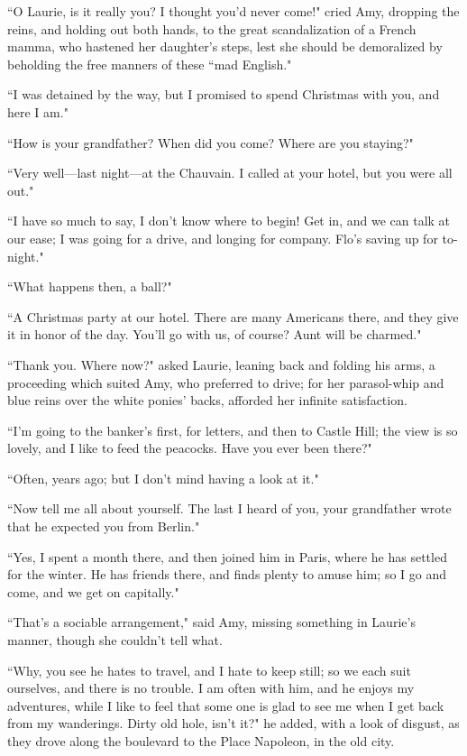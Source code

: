 ``O Laurie, is it really you? I thought you'd never
come!" cried Amy, dropping the reins, and holding out both hands, to the
great scandalization of a French mamma, who hastened her
daughter's steps, lest she should be demoralized by
beholding the free manners of these ``mad English."

``I was detained by the way, but I promised to spend Christmas with you,
and here I am."

``How is your grandfather? When did you come? Where are you staying?"

``Very well---last night---at the Chauvain. I called at your hotel, but
you were all out."

``I have so much to say, I don't know where to begin! Get
in, and we can talk at our ease; I was going for a drive, and longing
for company. Flo's saving up for to-night."

``What happens then, a ball?"

``A Christmas party at our hotel. There are many Americans there, and
they give it in honor of the day. You'll go with us, of
course? Aunt will be charmed."

``Thank you. Where now?" asked Laurie, leaning back and folding his arms,
a proceeding which suited Amy, who preferred to drive; for her
parasol-whip and blue reins over the white ponies'
backs, afforded her infinite satisfaction.

``I'm going to the banker's first, for
letters, and then to Castle Hill; the view is so lovely, and I like to
feed the peacocks. Have you ever been there?"

``Often, years ago; but I don't mind having a look at
it."

``Now tell me all about yourself. The last I heard of you, your
grandfather wrote that he expected you from Berlin."

``Yes, I spent a month there, and then joined him in Paris, where he has
settled for the winter. He has friends there, and finds plenty to amuse
him; so I go and come, and we get on capitally."

``That's a sociable arrangement," said Amy, missing
something in Laurie's manner, though she
couldn't tell what.

``Why, you see he hates to travel, and I hate to keep still; so we each
suit ourselves, and there is no trouble. I am often with him, and he
enjoys my adventures, while I like to feel that some one is glad to see
me when I get back from my wanderings. Dirty old hole,
isn't it?" he added, with a look of disgust, as they
drove along the boulevard to the Place Napoleon, in the old city.

